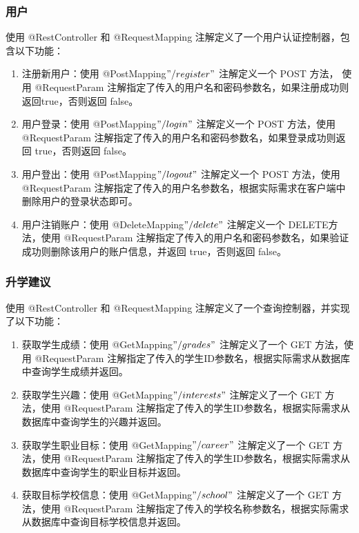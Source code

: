 \documentclass[UTF8]{ctexart}
\newcommand{\m}[1]{\textcolor{modify}{#1}}
\begin{document}
    \subsubsection{用户}
    使用 @RestController 和 @RequestMapping 注解定义了一个用户认证控制器，包含以下功能：
    \m{
        \begin{enumerate}
            \item 注册新用户：使用 @PostMapping\("/register"\) 注解定义一个 POST 方法， 使用 @RequestParam 注解指定了传入的用户名和密码参数名，如果注册成功则返回true，否则返回 false。
            \item 用户登录：使用 @PostMapping\("/login"\) 注解定义一个 POST 方法，使用  @RequestParam 注解指定了传入的用户名和密码参数名，如果登录成功则返回 true，否则返回 false。
            \item 用户登出：使用 @PostMapping\("/logout"\) 注解定义一个 POST 方法，使用 @RequestParam 注解指定了传入的用户名参数名，根据实际需求在客户端中删除用户的登录状态即可。
            \item  用户注销账户：使用 @DeleteMapping\("/delete"\) 注解定义一个 DELETE方法，使用 @RequestParam 注解指定了传入的用户名和密码参数名，如果验证成功则删除该用户的账户信息，并返回 true，否则返回 false。
        \end{enumerate}
    }
    \subsubsection{升学建议}
    使用 @RestController 和 @RequestMapping 注解定义了一个查询控制器，并实现了以下功能：
    \m{
        \begin{enumerate}
            \item 获取学生成绩：使用 @GetMapping\("/grades"\) 注解定义了一个 GET 方法，使用 @RequestParam 注解指定了传入的学生ID参数名，根据实际需求从数据库中查询学生成绩并返回。
            \item 获取学生兴趣：使用 @GetMapping\("/interests"\) 注解定义了一个 GET 方法，使用 @RequestParam 注解指定了传入的学生ID参数名，根据实际需求从数据库中查询学生的兴趣并返回。
            \item 获取学生职业目标：使用 @GetMapping\("/career"\) 注解定义了一个 GET 方法，使用 @RequestParam 注解指定了传入的学生ID参数名，根据实际需求从数据库中查询学生的职业目标并返回。
            \item  获取目标学校信息：使用 @GetMapping\("/school"\) 注解定义了一个 GET 方法，使用 @RequestParam 注解指定了传入的学校名称参数名，根据实际需求从数据库中查询目标学校信息并返回。
        \end{enumerate}
    }
\end{document}
